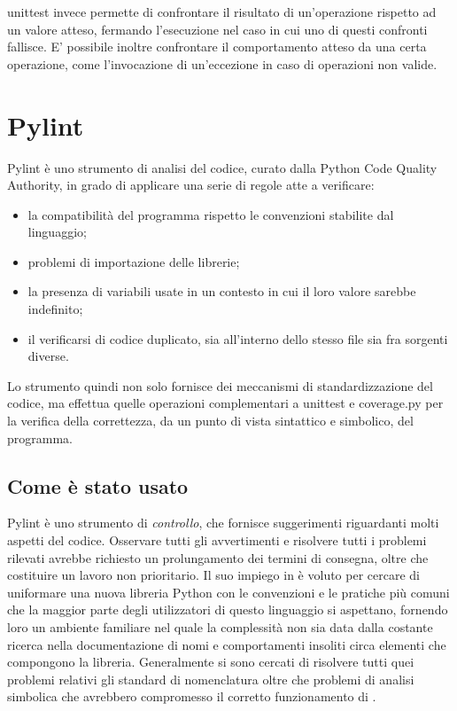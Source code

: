 unittest invece permette di confrontare il risultato di un'operazione rispetto
ad un valore atteso, fermando l'esecuzione nel caso in cui uno di questi
confronti fallisce. E' possibile inoltre confrontare il comportamento atteso
da una certa operazione, come l'invocazione di un'eccezione in caso di
operazioni non valide.

\section{Pylint}
\nocite{pylint}
Pylint è uno strumento di analisi del codice, curato dalla
Python Code Quality Authority\cite{pycqa}, in grado di applicare
una serie di regole atte a verificare:
\begin{itemize}
	\item la compatibilità del programma rispetto le convenzioni stabilite
		dal linguaggio\cite{python-pep8};
	\item problemi di importazione delle librerie;
	\item la presenza di variabili usate in un contesto in cui il loro valore
		sarebbe indefinito;
	\item il verificarsi di codice duplicato, sia all'interno dello stesso file
		sia fra sorgenti diverse.
\end{itemize}

Lo strumento quindi non solo fornisce dei meccanismi di standardizzazione
del codice, ma effettua quelle operazioni complementari a unittest e coverage.py
per la verifica della correttezza, da un punto di vista sintattico e simbolico,
del programma.

\subsection{Come è stato usato}

Pylint è uno strumento di \emph{controllo}, che fornisce suggerimenti riguardanti molti
aspetti del codice. Osservare tutti gli avvertimenti e risolvere tutti i problemi
rilevati avrebbe richiesto un prolungamento dei termini di consegna, oltre che
costituire un lavoro non prioritario.
Il suo impiego in \pygfa è voluto per cercare di uniformare una nuova libreria
Python con le convenzioni e le pratiche più comuni che la maggior parte degli
utilizzatori di questo linguaggio si aspettano, fornendo loro un ambiente
familiare nel quale la complessità non sia data dalla costante ricerca nella
documentazione di nomi e comportamenti insoliti circa elementi che compongono
la libreria. Generalmente si sono cercati di risolvere tutti quei problemi relativi gli standard
di nomenclatura oltre che problemi di analisi simbolica che avrebbero compromesso
il corretto funzionamento di \pygfa.


